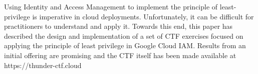 Using Identity and Access Management to implement the principle of least-privilege is imperative in cloud deployments.
Unfortunately, it can be difficult for practitioners to understand and apply it.  Towards this end,
this paper has described the design and implementation of a set of CTF exercises focused on applying the principle of least privilege in Google Cloud IAM.
Results from an initial offering are promising and the CTF itself has been made available at https://thunder-ctf.cloud
